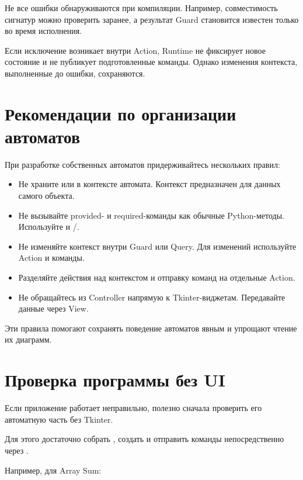 Не все ошибки обнаруживаются при компиляции.
Например, совместимость сигнатур можно проверить
заранее, а результат Guard становится известен
только во время исполнения.

Если исключение возникает внутри Action, Runtime
не фиксирует новое состояние и не публикует
подготовленные команды. Однако изменения контекста,
выполненные до ошибки, сохраняются.

\section{Рекомендации по организации автоматов}

При разработке собственных автоматов придерживайтесь
нескольких правил:

\begin{itemize}
  \item Не храните  или 
    в контексте автомата. Контекст предназначен
    для данных самого объекта.

  \item Не вызывайте provided- и required-команды
    как обычные Python-методы. Используйте
     и /.

  \item Не изменяйте контекст внутри Guard или Query.
    Для изменений используйте Action и команды.

  \item Разделяйте действия над контекстом и
    отправку команд на отдельные Action.

  \item Не обращайтесь из Controller напрямую
    к Tkinter-виджетам. Передавайте данные через View.
\end{itemize}

Эти правила помогают сохранять поведение автоматов
явным и упрощают чтение их диаграмм.

\section{Проверка программы без UI}

Если приложение работает неправильно, полезно
сначала проверить его автоматную часть без Tkinter.

Для этого достаточно собрать , создать
 и отправить команды непосредственно
через .

Например, для Array Sum:

